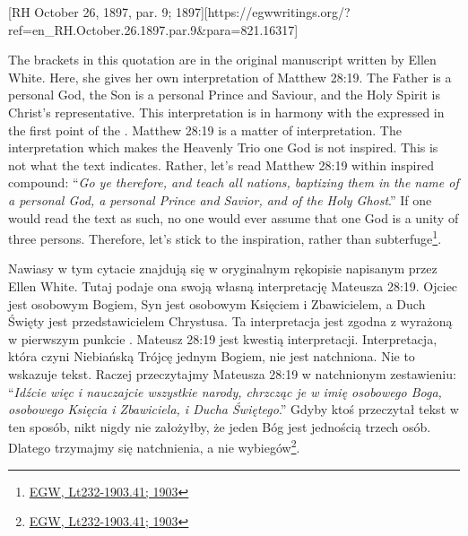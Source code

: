 [RH October 26, 1897, par. 9; 1897][https://egwwritings.org/?ref=en\_RH.October.26.1897.par.9&para=821.16317]


The brackets in this quotation are in the original manuscript written by Ellen White. Here, she gives her own interpretation of Matthew 28:19. The Father is a personal God, the Son is a personal Prince and Saviour, and the Holy Spirit is Christ’s representative. This interpretation is in harmony with the  expressed in the first point of the . Matthew 28:19 is a matter of interpretation. The interpretation which makes the Heavenly Trio one God is not inspired. This is not what the text indicates. Rather, let's read Matthew 28:19 within inspired compound: “\textit{Go ye therefore, and teach all nations, baptizing them in the name of a personal God, a personal Prince and Savior, and of the Holy Ghost}.” If one would read the text as such, no one would ever assume that one God is a unity of three persons. Therefore, let's stick to the inspiration, rather than subterfuge\footnote{\href{https://egwwritings.org/?ref=en\_Lt232-1903.41&para=10197.50}{{EGW, Lt232-1903.41; 1903}}}.


Nawiasy w tym cytacie znajdują się w oryginalnym rękopisie napisanym przez Ellen White. Tutaj podaje ona swoją własną interpretację Mateusza 28:19. Ojciec jest osobowym Bogiem, Syn jest osobowym Księciem i Zbawicielem, a Duch Święty jest przedstawicielem Chrystusa. Ta interpretacja jest zgodna z  wyrażoną w pierwszym punkcie . Mateusz 28:19 jest kwestią interpretacji. Interpretacja, która czyni Niebiańską Trójcę jednym Bogiem, nie jest natchniona. Nie to wskazuje tekst. Raczej przeczytajmy Mateusza 28:19 w natchnionym zestawieniu: “\textit{Idźcie więc i nauczajcie wszystkie narody, chrzcząc je w imię osobowego Boga, osobowego Księcia i Zbawiciela, i Ducha Świętego}.” Gdyby ktoś przeczytał tekst w ten sposób, nikt nigdy nie założyłby, że jeden Bóg jest jednością trzech osób. Dlatego trzymajmy się natchnienia, a nie wybiegów\footnote{\href{https://egwwritings.org/?ref=en\_Lt232-1903.41&para=10197.50}{{EGW, Lt232-1903.41; 1903}}}.



